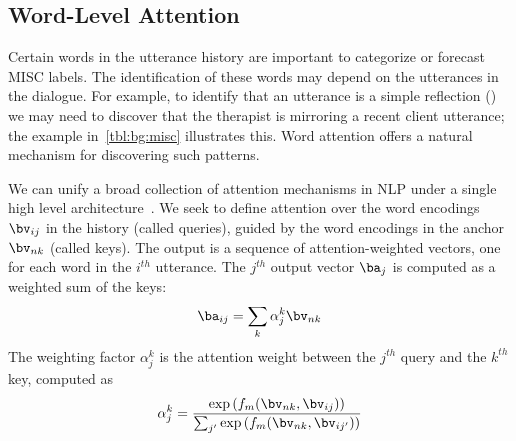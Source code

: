 \subsection{Word-Level Attention}
\label{ssec:word_att}

Certain words in the utterance history are important to categorize or
forecast MISC labels. The identification of these words may depend on
the utterances in the dialogue. For example, to identify that an
utterance is a simple reflection (\RES) we may need to discover that
the therapist is mirroring a recent client utterance; the example
in~\autoref{tbl:bg:misc} illustrates this. Word attention offers a
natural mechanism for discovering such patterns.


We can unify a broad collection of attention mechanisms in NLP under
a single high level architecture~\cite{galassi2019attention}. We
seek to define attention over the word encodings $\bv_{ij}$ in the
history (called queries), guided by the word encodings in the anchor
$\bv_{nk}$ (called keys). The output is a sequence of
attention-weighted vectors, one for each word in the $i^{th}$
utterance.  The $j^{th}$ output vector $\ba_j$ is computed as a
weighted sum of the keys:
\begin{equation}
  \ba_{ij} = \sum_{k} \alpha^{k}_{j} \bv_{nk}
\label{eq:att_sum}
\end{equation}
The weighting factor $\alpha^k_j$ is the attention weight between
the $j^{th}$ query and the $k^{th}$ key, computed as
\begin{equation}
\label{eq:att_weight}
\alpha^{k}_{j} = \frac{\exp\left(f_{m}(\bv_{nk}, \bv_{ij})\right)}{\sum_{j^{\prime}} \exp\left(f_{m}(\bv_{nk}, \bv_{ij^\prime})\right)}
\end{equation}

